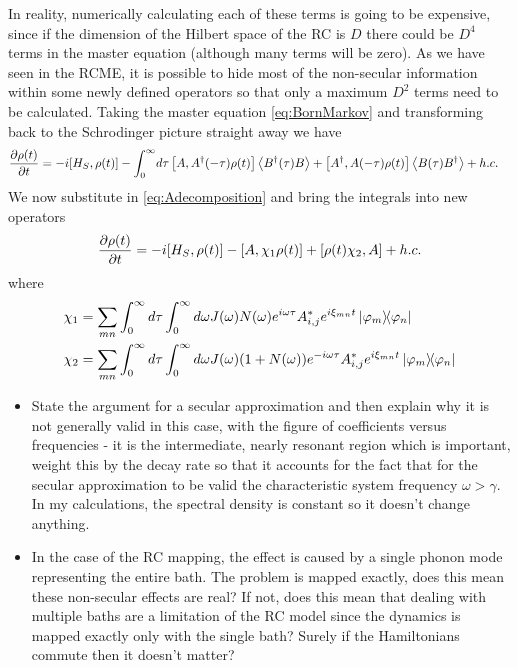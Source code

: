 \documentclass[]{article}
\begin{document}
In reality, numerically calculating each of these terms is going to be expensive, since if the dimension of the Hilbert space of the RC is $D$ there could be $D^4$ terms in the master equation (although many terms will be zero). As we have seen in the RCME, it is possible to hide most of the non-secular information within some newly defined operators so that only a maximum $D^2$ terms need to be calculated. Taking the master equation \ref{eq:BornMarkov} and transforming back to the Schrodinger picture straight away we have
\begin{align}
	\begin{split}
		\label{eq:BornMarkovSchrod}
		\pdv{\rho(t)}{t} = -i[H_S, \rho(t)] - \int_{0}^{\infty}& d\tau  \left[A, A^{\dagger}(-\tau)\rho(t)\right] \expval{B^{\dagger}(\tau)B} + \left[A^{\dagger},A(-\tau)\rho(t)\right] \expval{B(\tau)B^{\dagger}} + h.c.
	\end{split}
\end{align}
We now substitute in \ref{eq:Adecomposition} and bring the integrals into new operators
\begin{align}
	\begin{split}
		\pdv{\rho(t)}{t} = -i[H_S, \rho(t)] - \left[A, \chi_1\rho(t)\right]  + \left[\rho(t)\chi_2,A\right] + h.c.
	\end{split}
\end{align}
where 
\begin{align}
	\begin{split}
\chi_1 &= \sum_{m n}\int_{0}^{\infty}d\tau\int_{0}^{\infty}d\omega J(\omega)N(\omega)e^{i\omega\tau}A_{i,j}^* e^{i\xi_{mn}t}\dyad{\varphi_m}{\varphi_n} \\
\chi_2 &= \sum_{m n}\int_{0}^{\infty}d\tau\int_{0}^{\infty}d\omega J(\omega)(1+N(\omega))e^{-i\omega\tau}A_{i,j}^* e^{i\xi_{mn}t}\dyad{\varphi_m}{\varphi_n} 
	\end{split}
\end{align}

\begin{itemize}
	\item State the argument for a secular approximation and then explain why it is not generally valid in this case, with the figure of coefficients versus frequencies - it is the intermediate, nearly resonant region which is important, weight this by the decay rate so that it accounts for the fact that for the secular approximation to be valid the characteristic system frequency $\omega>\gamma$. In my calculations, the spectral density is constant so it doesn't change anything.
	\item In the case of the RC mapping, the effect is caused by a single phonon mode representing the entire bath. The problem is mapped exactly, does this mean these non-secular effects are real? If not, does this mean that dealing with multiple baths are a limitation of the RC model since the dynamics is mapped exactly only with the single bath? Surely if the Hamiltonians commute then it doesn't matter?
	
	
\end{itemize}
\end{document}
